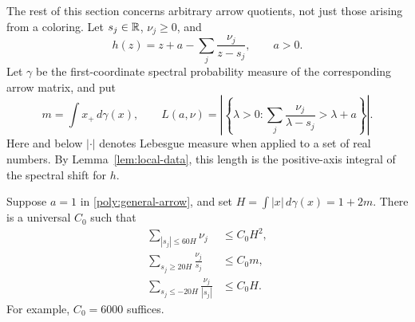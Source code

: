 The rest of this section concerns arbitrary arrow quotients, not just
those arising from a coloring. Let $s_j\in\mathbb R$, $\nu_j\geq0$, and
\begin{equation}\label{poly:general-arrow}
 h(z)=z+a-\sum_j\frac{\nu_j}{z-s_j},\qquad a>0.
\end{equation}
Let $\gamma$ be the first-coordinate spectral probability measure of
the corresponding arrow matrix, and put
\begin{equation}\label{poly:length-definition}
 m=\int x_+\,d\gamma(x),\qquad
 L(a,\nu)=\left|\left\{\lambda>0:
       \sum_j\frac{\nu_j}{\lambda-s_j}>\lambda+a\right\}\right|.
\end{equation}
Here and below $|\cdot|$ denotes Lebesgue measure when applied to a set
of real numbers. By Lemma~\ref{lem:local-data}, this length is the
positive-axis integral of the spectral shift for $h$.

\begin{lemma}\label{poly:tail-control}
Suppose $a=1$ in \eqref{poly:general-arrow}, and set
$H=\int|x|\,d\gamma(x)=1+2m$. There is a universal $C_0$ such that
\begin{align}
 \sum_{|s_j|\leq60H}\nu_j&\leq C_0H^2,
       \label{poly:near-mass}\\
 \sum_{s_j\geq20H}\frac{\nu_j}{s_j}&\leq C_0m,
       \label{poly:positive-tail}\\
 \sum_{s_j\leq-20H}\frac{\nu_j}{|s_j|}&\leq C_0H.
       \label{poly:negative-tail}
\end{align}
For example, $C_0=6000$ suffices.
\end{lemma}

